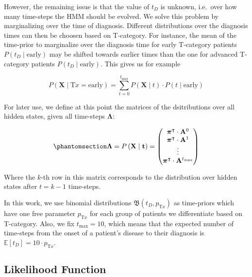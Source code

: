 \documentclass[
  sn-mathphys-num,
]{sn-jnl}
\begin{document}
However, the remaining issue is that the value of \(t_D\) is unknown,
i.e.~over how many time-steps the HMM should be evolved. We solve this
problem by marginalizing over the time of diagnosis. Different
distributions over the diagnosis times can then be choosen based on
T-category. For instance, the mean of the time-prior to marginalize over
the diagnosis time for early T-category patients
\(P\left( t_D \mid \text{early} \right)\) may be shifted towards earlier
times than the one for advanced T-category patients
\(P\left( t_D \mid \text{early} \right)\). This gives us for example

\[
P\left( \mathbf{X} \mid \text{T}x = \text{early} \right) = \sum_{t=0}^{t_\text{max}} P \left( \mathbf{X} \mid t \right) \cdot P(t \mid \text{early})
\]

For later use, we define at this point the matrices of the dsitributions
over all hidden states, given all time-steps \(\boldsymbol{\Lambda}\):

\begin{equation}\phantomsection\label{eq-lambda-matrix}{
\boldsymbol{\Lambda} = P \left( \mathbf{X} \mid \mathbf{t} \right) = \begin{pmatrix}
\boldsymbol{\pi}^\intercal \cdot \mathbf{A}^0 \\
\boldsymbol{\pi}^\intercal \cdot \mathbf{A}^1 \\
\vdots \\
\boldsymbol{\pi}^\intercal \cdot \mathbf{A}^{t_\text{max}} \\
\end{pmatrix}
}\end{equation}

Where the \(k\)-th row in this matrix corresponds to the distribution
over hidden states after \(t=k-1\) time-steps.

In this work, we use binomial distributions
\(\mathfrak{B} \left( t_D, p_{\text{T}x} \right)\) as time-priors which
have one free parameter \(p_{\text{T}x}\) for each group of patients we
differentiate based on T-category. Also, we fix \(t_\text{max} = 10\),
which means that the expected number of time-steps from the onset of a
patient's disease to their diagnosis is
\(\mathbb{E}\left[ t_D \right] = 10 \cdot p_{\text{T}x}\).

\subsection{Likelihood Function}\label{likelihood-function}
\end{document}
